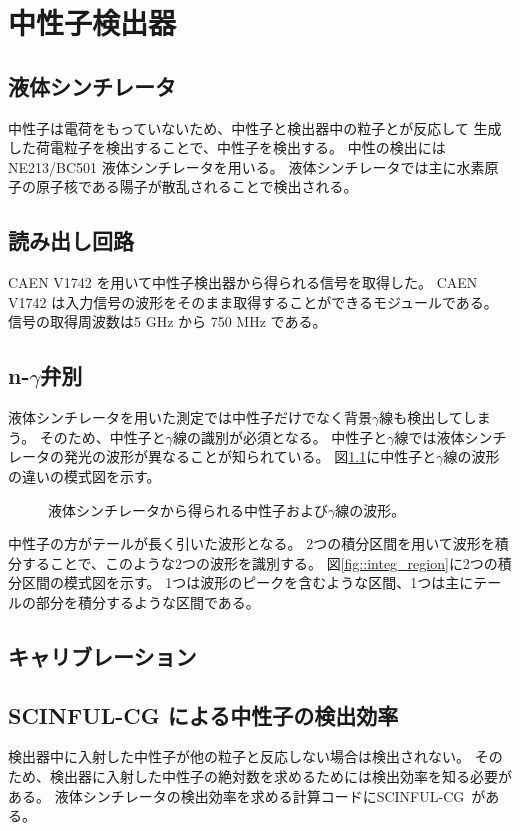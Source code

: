 \chapter{中性子検出器}
\section{液体シンチレータ}
中性子は電荷をもっていないため、中性子と検出器中の粒子とが反応して
生成した荷電粒子を検出することで、中性子を検出する。
中性の検出にはNE213/BC501 液体シンチレータを用いる。
液体シンチレータでは主に水素原子の原子核である陽子が散乱されることで検出される。

\section{読み出し回路}
CAEN V1742 を用いて中性子検出器から得られる信号を取得した。
CAEN V1742 は入力信号の波形をそのまま取得することができるモジュールである。
信号の取得周波数は5 GHz から 750 MHz である。

\section{n-$\gamma$弁別}
液体シンチレータを用いた測定では中性子だけでなく背景$\gamma$線も検出してしまう。
そのため、中性子と$\gamma$線の識別が必須となる。
中性子と$\gamma$線では液体シンチレータの発光の波形が異なることが知られている。
図\ref{fig::pulse_shape_n_gamma}に中性子と$\gamma$線の波形の違いの模式図を示す。
\begin{figure}
  \centering
  \caption{液体シンチレータから得られる中性子および$\gamma$線の波形。}
  \label{fig::pulse_shape_n_gamma} 
\end{figure}
中性子の方がテールが長く引いた波形となる。
2つの積分区間を用いて波形を積分することで、このような2つの波形を識別する。
図\ref{fig::integ_region}に2つの積分区間の模式図を示す。
1つは波形のピークを含むような区間、1つは主にテールの部分を積分するような区間である。


\section{キャリブレーション}
\section{SCINFUL-CG による中性子の検出効率}
検出器中に入射した中性子が他の粒子と反応しない場合は検出されない。
そのため、検出器に入射した中性子の絶対数を求めるためには検出効率を知る必要がある。
液体シンチレータの検出効率を求める計算コードにSCINFUL-CG~\cite{scinful-cg}がある。
